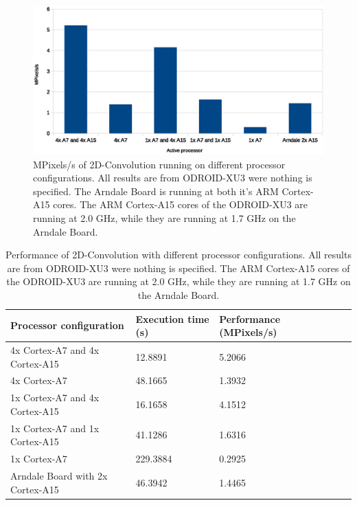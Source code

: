 \begin{figure}[H]
  \centering
  \includegraphics[width=160mm]{fig/mpixelss-configurations.eps}
  \caption{MPixels/s of 2D-Convolution running on different processor configurations. All results are from ODROID-XU3 were nothing is specified. The Arndale Board is running at both it's ARM Cortex-A15 cores. The ARM Cortex-A15 cores of the ODROID-XU3 are running at 2.0 GHz, while they are running at 1.7 GHz on the Arndale Board. \label{mpixelss-configurations}}
\end{figure}

\begin{table}[H]
  \begin{tabular}{llllll}
    \toprule
    Processor configuration           & Execution time (s)  & Performance (MPixels/s) \\
    \midrule
    4x Cortex-A7 and 4x Cortex-A15    & 12.8891             & 5.2066\\
    4x Cortex-A7                      & 48.1665             & 1.3932\\
    1x Cortex-A7 and 4x Cortex-A15    & 16.1658             & 4.1512\\
    1x Cortex-A7 and 1x Cortex-A15    & 41.1286             & 1.6316\\
    1x Cortex-A7                      & 229.3884            & 0.2925\\
    Arndale Board with 2x Cortex-A15    & 46.3942             & 1.4465\\
    \bottomrule
  \end{tabular}
  \caption{Performance of 2D-Convolution with different processor configurations. All results are from ODROID-XU3 were nothing is specified. The ARM Cortex-A15 cores of the ODROID-XU3 are running at 2.0 GHz, while they are running at 1.7 GHz on the Arndale Board. \label{performancetable}}
\end{table}

